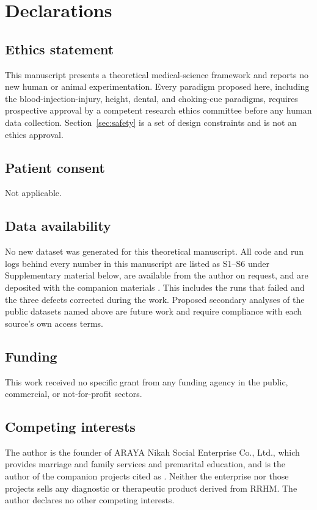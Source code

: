 \documentclass[9pt,twocolumn]{article}
\begin{document}
\section*{Declarations}
\subsection*{Ethics statement}
This manuscript presents a theoretical medical-science framework and reports no new human or animal experimentation. Every paradigm proposed here, including the blood-injection-injury, height, dental, and choking-cue paradigms, requires prospective approval by a competent research ethics committee before any human data collection. Section~\ref{sec:safety} is a set of design constraints and is not an ethics approval.

\subsection*{Patient consent}
Not applicable.

\subsection*{Data availability}
No new dataset was generated for this theoretical manuscript. All code and run logs behind every number in this manuscript are listed as S1--S6 under Supplementary material below, are available from the author on request, and are deposited with the companion materials \cite{lahtee2026ru}. This includes the runs that failed and the three defects corrected during the work. Proposed secondary analyses of the public datasets named above are future work and require compliance with each source's own access terms.

\subsection*{Funding}
This work received no specific grant from any funding agency in the public, commercial, or not-for-profit sectors.

\subsection*{Competing interests}
The author is the founder of ARAYA Nikah Social Enterprise Co., Ltd., which provides marriage and family services and premarital education, and is the author of the companion projects cited as \cite{lahtee2026ru,lahtee2026rc,lahtee2026birca,lahtee2026srct}. Neither the enterprise nor those projects sells any diagnostic or therapeutic product derived from RRHM. The author declares no other competing interests.
\end{document}
